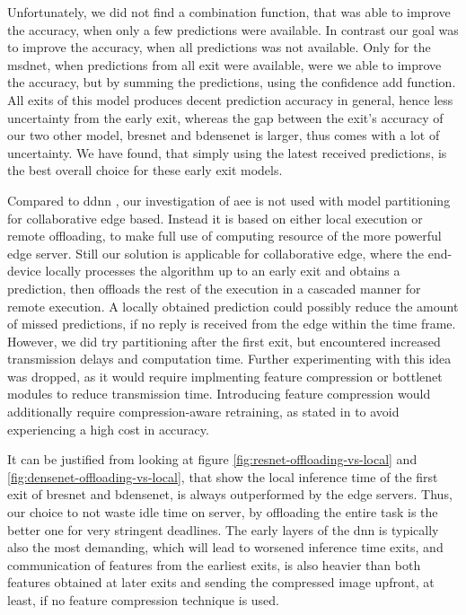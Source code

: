 Unfortunately, we did not find a combination function, that was able to improve the accuracy, when only a few predictions were available. In contrast our goal was to improve the accuracy, when all predictions was not available. Only for the \gls{msdnet}, when predictions from all exit were available, were we able to improve the accuracy, but by summing the predictions, using the confidence add function. All exits of this model produces decent prediction accuracy in general, hence less uncertainty from the early exit, whereas the gap between the exit's accuracy of our two other model, \gls{bresnet} and \gls{bdensenet} is larger, thus comes with a lot of uncertainty. We have found, that simply using the latest received predictions, is the best overall choice for these early exit models.

Compared to \gls{ddnn} \cite{teerapittayanon_distributed_2017}, our investigation of \gls{aee} is not used with model partitioning for collaborative edge based. Instead it is based on either local execution or remote offloading, to make full use of computing resource of the more powerful edge server. Still our solution is applicable for collaborative edge, where the end-device locally processes the algorithm up to an early exit and obtains a prediction, then offloads the rest of the execution in a cascaded manner for remote execution. A locally obtained prediction could possibly reduce the amount of missed predictions, if no reply is received from the edge within the time frame. However, we did try partitioning after the first exit, but encountered increased transmission delays and computation time. Further experimenting with this idea was dropped, as it would require implmenting feature compression or \gls{bottlenet} modules to reduce transmission time. Introducing feature compression would additionally require compression-aware retraining, as stated in \cite{choi_near-lossless_2018,choi_near-lossless_2018,eshratifar_bottlenet:_2019}  to avoid experiencing a high cost in accuracy.

It can be justified from looking at figure \ref{fig:resnet-offloading-vs-local} and \ref{fig:densenet-offloading-vs-local}, that show the local inference time of the first exit of \gls{bresnet} and \gls{bdensenet}, is always outperformed by the edge servers. Thus, our choice to not waste idle time on server, by offloading the entire task is the better one for very stringent deadlines. The early layers of the \gls{dnn} is typically also the most demanding, which will lead to worsened inference time exits, and communication of features from the earliest exits, is also heavier than both  features obtained at later exits and sending the compressed image upfront, at least, if no feature compression technique is used.

